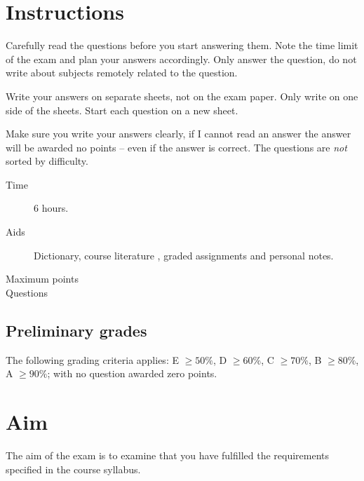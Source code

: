 \documentclass[addpoints]{miunexam}
\date{2013-01-18}
\author{%
	Daniel Bosk\\
  {\small\texttt{\href{mailto:daniel.bosk@miun.se}{daniel.bosk@miun.se}}}\\
  {\small\textit{Phone:} 060\,-\,14\,8709}\\
}
\begin{document}
\maketitle
\thispagestyle{foot}

\section*{Instructions}
\label{sec:Instructions}
\noindent
Carefully read the questions before you start answering them.
Note the time limit of the exam and plan your answers accordingly.
Only answer the question, do not write about subjects remotely related to the
question.

Write your answers on separate sheets, not on the exam paper.
Only write on one side of the sheets.
Start each question on a new sheet.

Make sure you write your answers clearly, if I cannot read an answer the answer
will be awarded no points -- even if the answer is correct.
The questions are \emph{not} sorted by difficulty.

\begin{description}
	\item[Time] 6 hours.
  \item[Aids] Dictionary, course literature \cite{Silberschatz2009osc}, graded 
    assignments and personal notes.
	\item[Maximum points] \numpoints
	\item[Questions] \numquestions
\end{description}


\subsection*{Preliminary grades}
\noindent
The following grading criteria applies:
E \(\geq 50\%\),
D \(\geq 60\%\),
C \(\geq 70\%\), 
B \(\geq 80\%\),
A \(\geq 90\%\);
with no question awarded zero points.


\section*{Aim}
\label{sec:Aim}
\noindent
The aim of the exam is to examine that you have fulfilled the requirements 
specified in the course syllabus.
\end{document}
